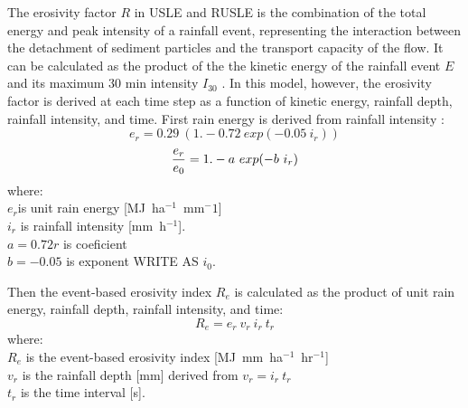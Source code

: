 \documentclass[gmd, manuscript]{copernicus}
\begin{document}
The erosivity factor $R$ 
in USLE and RUSLE 
is the combination of the total energy 
and peak intensity of a rainfall event,
representing the interaction 
between the detachment of sediment particles
and the transport capacity of the flow. 
It can be calculated as the product of the 
the kinetic energy of the rainfall event $E$
and its maximum 30 \unit{min} intensity $I_{30}$
\citep{Brown1987,Renard1997}.
In this model, however, the erosivity factor
is derived at each time step as a function of
kinetic energy, rainfall depth, rainfall intensity, and time.
First rain energy is derived from rainfall intensity \citep{Brown1987}:
%
\begin{equation}
\label{eq:rain_energy}
{e_r = 0.29 ~ (1.-0.72 ~ exp(-0.05 ~ i_r))}
\end{equation}
\begin{equation}
\label{eq:rain_energy}
{e_r \over e_0} = 1.- a ~ exp(-b ~ i_r)
\end{equation}
%
{\small
\noindent
where: \\
\noindent
\hspace*{0.5em} $e_r$is unit rain energy [\unit{MJ~ha}$^{-1}$~\unit{mm}${^-1}$]\\
\hspace*{0.5em} $i_r$ is rainfall intensity [\unit{mm~h}$^{-1}$].\\
\hspace*{0.5em} $a=0.72r$ is coeficient\\
\hspace*{0.5em} $b=-0.05$ is exponent WRITE AS $i_0$.
}

\noindent
Then the event-based erosivity index $R_e$ 
is calculated as the product of 
unit rain energy, rainfall depth, rainfall intensity, and time: 
\begin{equation}
\label{eq:erosivity_index}
{R_e = e_r ~ v_r ~ i_r ~ t_r}
\end{equation}
%
{\small
\noindent
where: \\
\hspace*{0.5em} $R_e$ is the event-based erosivity index [\unit{MJ~mm~ha}$^{-1}$~\unit{hr}$^{-1}$]\\
\hspace*{0.5em} $v_r$ is the rainfall depth [\unit{mm}] derived from ${v_r = i_r~t_r}$\\
\hspace*{0.5em} $t_r$ is the time interval [\unit{s}].
}
\end{document}
